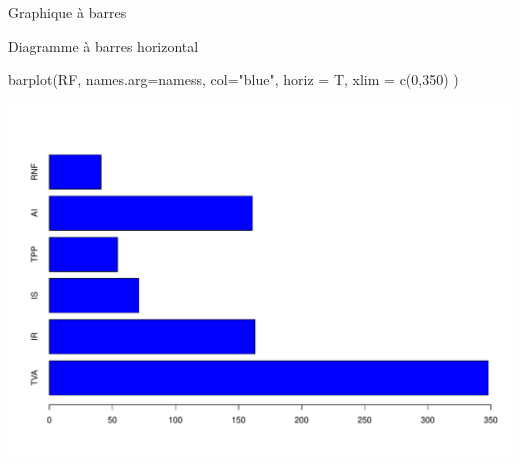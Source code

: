 \documentclass[
  8pt,
  ignorenonframetext,
]{beamer}
\newenvironment{Shaded}{\begin{snugshade}}{\end{snugshade}}
\newcommand{\AttributeTok}[1]{\textcolor[rgb]{0.77,0.63,0.00}{#1}}
\newcommand{\DecValTok}[1]{\textcolor[rgb]{0.00,0.00,0.81}{#1}}
\newcommand{\FunctionTok}[1]{\textcolor[rgb]{0.00,0.00,0.00}{#1}}
\newcommand{\NormalTok}[1]{#1}
\newcommand{\StringTok}[1]{\textcolor[rgb]{0.31,0.60,0.02}{#1}}
\begin{document}
\begin{frame}[fragile]{Graphique à barres}
\protect\hypertarget{graphique-uxe0-barres-1}{}
\begin{block}{Diagramme à barres horizontal}
\protect\hypertarget{diagramme-uxe0-barres-horizontal}{}
\begin{Shaded}
\begin{Highlighting}[]
\FunctionTok{barplot}\NormalTok{(RF, }\AttributeTok{names.arg=}\NormalTok{namess, }\AttributeTok{col=}\StringTok{"blue"}\NormalTok{, }\AttributeTok{horiz =}\NormalTok{ T, }\AttributeTok{xlim =} \FunctionTok{c}\NormalTok{(}\DecValTok{0}\NormalTok{,}\DecValTok{350}\NormalTok{) )}
\end{Highlighting}
\end{Shaded}

\begin{center}\includegraphics[width=0.8\linewidth]{Chap2_R_files/figure-beamer/unnamed-chunk-15-1} \end{center}
\end{block}
\end{frame}
\end{document}
